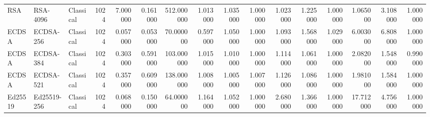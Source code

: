 \begin{table}
\begin{tabular}{lllrrrrrrrrrrrrr}
RSA & RSA-4096 & Classical & 1024 & 7.000000 & 0.161000 & 512.000000 & 1.013000 & 1.035000 & 1.000000 & 1.023000 & 1.225000 & 1.000000 & 1.065000 & 3.108000 & 1.000000 \\
ECDSA & ECDSA-256 & Classical & 1024 & 0.057000 & 0.053000 & 70.000000 & 0.597000 & 1.050000 & 1.000000 & 1.093000 & 1.568000 & 1.029000 & 6.003000 & 6.808000 & 1.000000 \\
ECDSA & ECDSA-384 & Classical & 1024 & 0.303000 & 0.591000 & 103.000000 & 1.015000 & 1.010000 & 1.000000 & 1.114000 & 1.061000 & 1.000000 & 2.082000 & 1.548000 & 0.990000 \\
ECDSA & ECDSA-521 & Classical & 1024 & 0.357000 & 0.609000 & 138.000000 & 1.008000 & 1.005000 & 1.007000 & 1.126000 & 1.086000 & 1.000000 & 1.981000 & 1.584000 & 1.000000 \\
Ed25519 & Ed25519-256 & Classical & 1024 & 0.068000 & 0.150000 & 64.000000 & 1.164000 & 1.052000 & 1.000000 & 2.680000 & 1.366000 & 1.000000 & 17.712000 & 4.756000 & 1.000000 \\
\bottomrule
\end{tabular}
\end{table}
